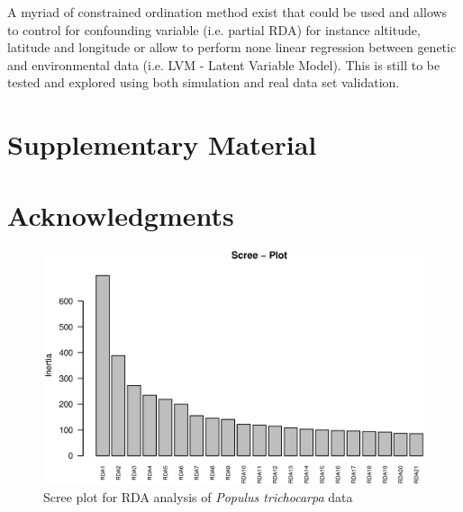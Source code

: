 \documentclass[a4paper,times,10pt,authoryear]{article}%
\begin{document}
A myriad of constrained ordination method exist that could be used and allows to control for confounding variable (i.e. partial RDA) for instance altitude, latitude and longitude or allow to perform none linear regression between genetic and environmental data (i.e. LVM - Latent Variable Model). This is still to be tested and explored using both simulation and real data set validation.


\section{Supplementary Material}


\section{Acknowledgments}






\begin{figure}[t]
\begin{center}
\includegraphics[height=0.25\textheight]{figures/screeplot-rda.eps}
\end{center}
\caption{Scree plot for RDA analysis of \textit{Populus trichocarpa} data}%
\label{fig:screeplotrda}%
\end{figure}
\end{document}

